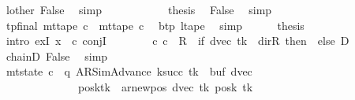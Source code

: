 \begin{isabellebody}
\ lother\ False\ \isamarkupfalse%
\ simp\isanewline
\ \ \ \ \ \ \ \ \isamarkupfalse%
\ \isamarkupfalse%
\ {\isacharquery}{\kern0pt}thesis\ \isamarkupfalse%
\ False\ \isamarkupfalse%
\ simp\isanewline
\ \ \ \ \ \ \isamarkupfalse%
\isanewline
\ \ \ \ \isamarkupfalse%
\isanewline
\ \ \ \ \isamarkupfalse%
\ tp{\isacharunderscore}{\kern0pt}final{\isacharcolon}{\kern0pt}\ {\isachardoublequoteopen}mt{\isacharunderscore}{\kern0pt}tape\ c{\isacharprime}{\kern0pt}\ {\isacharequal}{\kern0pt}\ mt{\isacharunderscore}{\kern0pt}tape\ c{}{\isachardoublequoteclose}\ \isamarkupfalse%
\ btp\ ltape\ \isamarkupfalse%
\ simp\isanewline
\ \ \ \ \isamarkupfalse%
\ {\isacharquery}{\kern0pt}thesis\isanewline
\ \ \ \ \isamarkupfalse%
\ {\isacharparenleft}{\kern0pt}intro\ exI{\isacharbrackleft}{\kern0pt}\ x\ {\isacharequal}{\kern0pt}\ c{\isacharprime}{\kern0pt}{\isacharbrackright}{\kern0pt}\ conjI{\isacharparenright}{\kern0pt}\isanewline
\ \ \ \ \ \ \isamarkupfalse%
\ {\isachardoublequoteopen}{\isacharparenleft}{\kern0pt}c{}{\isacharcomma}{\kern0pt}\ c{\isacharprime}{\kern0pt}{\isacharparenright}{\kern0pt}\ {\isasymin}\ {\isacharquery}{\kern0pt}R\ {\isacharcircum}{\kern0pt}{\isacharcircum}{\kern0pt}\ {\isacharparenleft}{\kern0pt}if\ dvec\ tk\ {\isacharequal}{\kern0pt}\ dir{\isachardot}{\kern0pt}R\ then\ {}\ else\ {\isacharquery}{\kern0pt}D{\isacharparenright}{\kern0pt}{\isachardoublequoteclose}\isanewline
\ \ \ \ \ \ \ \ \isamarkupfalse%
\ chainD\ False\ \isamarkupfalse%
\ simp\isanewline
\ \ \ \ \ \ \isamarkupfalse%
\ {\isachardoublequoteopen}mt{\isacharunderscore}{\kern0pt}state\ c{\isacharprime}{\kern0pt}\ {\isacharequal}{\kern0pt}\ {\isacharparenleft}{\kern0pt}q{\isacharcomma}{\kern0pt}\ AR{\isacharunderscore}{\kern0pt}SimAdvance{\isacharcomma}{\kern0pt}\ k{\isacharunderscore}{\kern0pt}succ\ tk{\isacharcomma}{\kern0pt}\ {}{\isacharcomma}{\kern0pt}\ buf{\isacharcomma}{\kern0pt}\ dvec{\isacharcomma}{\kern0pt}\isanewline
\ \ \ \ \ \ \ \ \ \ \ \ \ \ posk{\isacharparenleft}{\kern0pt}tk\ {\isacharcolon}{\kern0pt}{\isacharequal}{\kern0pt}\ ar{\isacharunderscore}{\kern0pt}newpos\ {\isacharparenleft}{\kern0pt}dvec\ tk{\isacharparenright}{\kern0pt}\ {\isacharparenleft}{\kern0pt}posk\ tk{\isacharparenright}{\kern0pt}{\isacharparenright}{\kern0pt}{\isacharparenright}{\kern0pt}{\isachardoublequoteclose}\ \isamarkupfalse%

\end{isabellebody}
